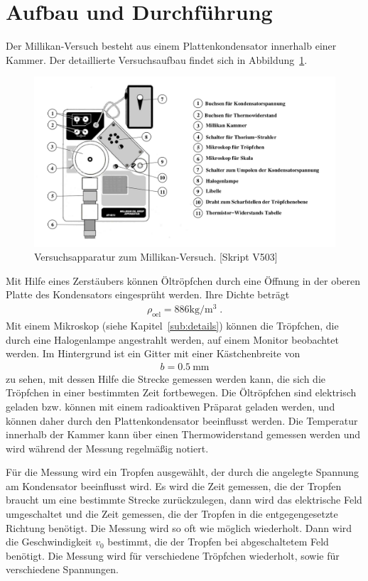 \newpage
\section{Aufbau und Durchführung}\label{sec:aufbau-und-durchfuehrung}

Der Millikan-Versuch besteht aus einem Plattenkondensator innerhalb einer Kammer. Der detaillierte Versuchsaufbau findet sich in Abbildung~\ref{fig:aufbau}.
\begin{figure}[H]
  \centering
  \includegraphics[width=0.4\textheight]{../figures/aufbau.png}
  \caption{Versuchsapparatur zum Millikan-Versuch. [Skript V503]}
\label{fig:aufbau}
\end{figure}

Mit Hilfe eines Zerstäubers können Öltröpfchen durch eine Öffnung in der oberen Platte des Kondensators eingesprüht werden. Ihre Dichte beträgt
\begin{align}
  \rho_{\mathrm{oel}} = 886 \si{\kilogram\per\cubic\m} \; .
\end{align}
Mit einem Mikroskop (siehe Kapitel~\ref{sub:details}) können die Tröpfchen, die durch eine Halogenlampe angestrahlt werden, auf einem Monitor beobachtet werden. Im Hintergrund ist ein Gitter mit einer Kästchenbreite von
\begin{align}
  b = \SI{0.5}{\milli\m}
\end{align}
zu sehen, mit dessen Hilfe die Strecke gemessen werden kann, die sich die Tröpfchen in einer bestimmten Zeit fortbewegen. Die Öltröpfchen sind elektrisch geladen bzw. können mit einem radioaktiven Präparat geladen werden, und können daher durch den Plattenkondensator beeinflusst werden. Die Temperatur innerhalb der Kammer kann über einen Thermowiderstand gemessen werden und wird während der Messung regelmäßig notiert.

Für die Messung wird ein Tropfen ausgewählt, der durch die angelegte Spannung am Kondensator beeinflusst wird. Es wird die Zeit gemessen, die der Tropfen braucht um eine bestimmte Strecke zurückzulegen, dann wird das elektrische Feld umgeschaltet und die Zeit gemessen, die der Tropfen in die entgegengesetzte Richtung benötigt. Die Messung wird so oft wie möglich wiederholt. Dann wird die Geschwindigkeit $v_0$ bestimmt, die der Tropfen bei abgeschaltetem Feld benötigt. Die Messung wird für verschiedene Tröpfchen wiederholt, sowie für verschiedene Spannungen.



